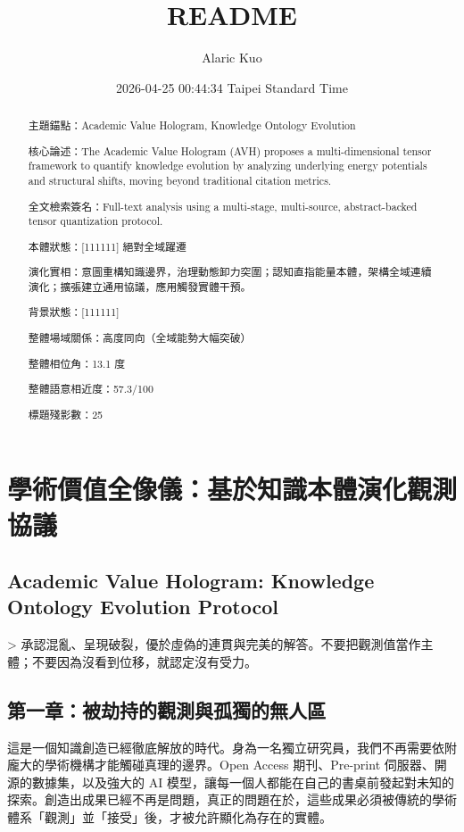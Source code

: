 \documentclass{article}
\title{README}
\author{Alaric Kuo}
\date{2026-04-25 00:44:34 Taipei Standard Time}
\begin{document}
\maketitle
\begin{abstract}
主題錨點：Academic Value Hologram, Knowledge Ontology Evolution

核心論述：The Academic Value Hologram (AVH) proposes a multi-dimensional tensor framework to quantify knowledge evolution by analyzing underlying energy potentials and structural shifts, moving beyond traditional citation metrics.

全文檢索簽名：Full-text analysis using a multi-stage, multi-source, abstract-backed tensor quantization protocol.

本體狀態：[111111] 絕對全域躍遷

演化實相：意圖重構知識邊界，治理動態卸力突圍；認知直指能量本體，架構全域連續演化；擴張建立通用協議，應用觸發實體干預。

背景狀態：[111111]

整體場域關係：高度同向（全域能勢大幅突破）

整體相位角：13.1 度

整體語意相近度：57.3/100

標題殘影數：25
\end{abstract}

\section{學術價值全像儀：基於知識本體演化觀測協議}
\subsection{Academic Value Hologram: Knowledge Ontology Evolution Protocol}

> 承認混亂、呈現破裂，優於虛偽的連貫與完美的解答。不要把觀測值當作主體；不要因為沒看到位移，就認定沒有受力。

\subsection{第一章：被劫持的觀測與孤獨的無人區}

這是一個知識創造已經徹底解放的時代。身為一名獨立研究員，我們不再需要依附龐大的學術機構才能觸碰真理的邊界。Open Access 期刊、Pre-print 伺服器、開源的數據集，以及強大的 AI 模型，讓每一個人都能在自己的書桌前發起對未知的探索。創造出成果已經不再是問題，真正的問題在於，這些成果必須被傳統的學術體系「觀測」並「接受」後，才被允許顯化為存在的實體。
\end{document}
